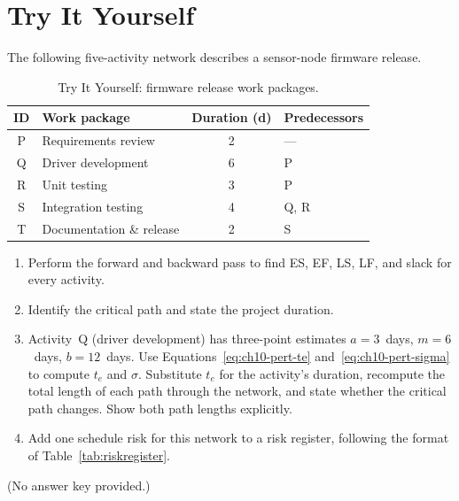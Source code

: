 \section*{Try It Yourself}


The following five-activity network describes a sensor-node firmware
release.

\begin{table}[h]
  \centering
  \caption{Try It Yourself: firmware release work packages.}
  \label{tab:tryit}
  \begin{tabular}{clcl}
    \hline
    \textbf{ID} & \textbf{Work package} & \textbf{Duration (d)} &
    \textbf{Predecessors} \\
    \hline
    P & Requirements review   & 2 & ---  \\
    Q & Driver development    & 6 & P    \\
    R & Unit testing          & 3 & P    \\
    S & Integration testing   & 4 & Q, R \\
    T & Documentation \& release & 2 & S \\
    \hline
  \end{tabular}
\end{table}

\begin{enumerate}
  \item Perform the forward and backward pass to find ES, EF, LS, LF,
        and slack for every activity.
  \item Identify the critical path and state the project duration.
  \item Activity~Q (driver development) has three-point estimates
        $a = 3$~days, $m = 6$~days, $b = 12$~days.
        Use Equations~\ref{eq:ch10-pert-te} and~\ref{eq:ch10-pert-sigma}
        to compute $t_e$ and $\sigma$.
        Substitute $t_e$ for the activity's duration, recompute the total length of each path through the network, and state whether the critical path changes. Show both path lengths explicitly.
  \item Add one schedule risk for this network to a risk register,
        following the format of Table~\ref{tab:riskregister}.
\end{enumerate}

\noindent(No answer key provided.)

